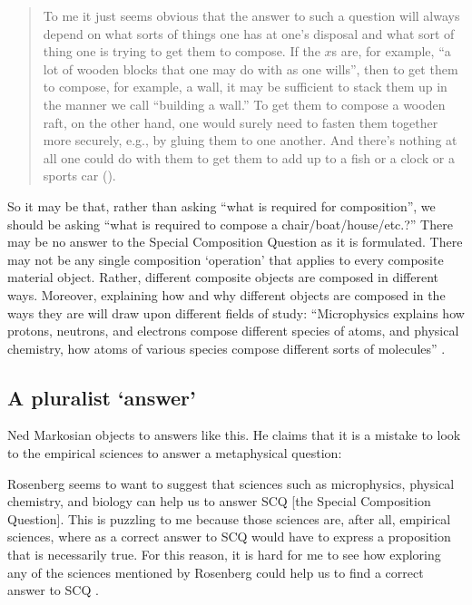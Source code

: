 \documentclass[11pt]{article}
\newenvironment{squote}{%
\begin{spacing}{1}
\begin{list}{}{%
    \setlength{\labelwidth}{0pt}%
    \rightmargin\leftmargin%
  }
\item\relax
}{%
\end{list}%
\end{spacing}
}
\begin{document}
\begin{spacing}{1.5}
\begin{quote}
To me it just seems obvious that the answer to such a question will
always depend on what sorts of things one has at one's disposal and
what sort of thing one is trying to get them to compose.  If the $x$s
are, for example, ``a lot of wooden blocks that one may do with as one
wills'', then to get them to compose, for example, a wall, it may be
sufficient to stack them up in the manner we call ``building a wall.''
To get them to compose a wooden raft, on the other hand, one would
surely need to fasten them together more securely, e.g., by gluing
them to one another.  And there's nothing at all one could do with
them to get them to add up to a fish or a clock or a sports car
(\citeyear[705]{rosenberg1993}).
\end{quote}

So it may be that, rather than asking ``what is required for
composition'', we should be asking ``what is required to compose a
chair/boat/house/etc.?''  There may be no answer to the Special
Composition Question as it is formulated.  There may not be any single
composition `operation' that applies to every composite material
object.  Rather, different composite objects are composed in different
ways.  Moreover, explaining how and why different objects are composed
in the ways they are will draw upon different fields of study:
``Microphysics explains how protons, neutrons, and electrons compose
different species of atoms, and physical chemistry, how atoms of
various species compose different sorts of molecules''
\citep[706]{rosenberg1993}.

\subsection{A pluralist `answer'}
\label{pluralist}
Ned Markosian objects to answers like this.  He claims that it is a
mistake to look to the empirical sciences to answer a metaphysical
question:

\begin{squote}
Rosenberg seems to want to suggest that sciences such as microphysics,
physical chemistry, and biology can help us to answer SCQ [the Special
  Composition Question].  This is puzzling to me because those
sciences are, after all, empirical sciences, where as a correct answer
to SCQ would have to express a proposition that is necessarily true.
For this reason, it is hard for me to see how exploring any of the
sciences mentioned by Rosenberg could help us to find a correct answer
to SCQ \citeyearpar[229]{markosian1998a}.
\end{squote}


\end{spacing}
\end{document}
